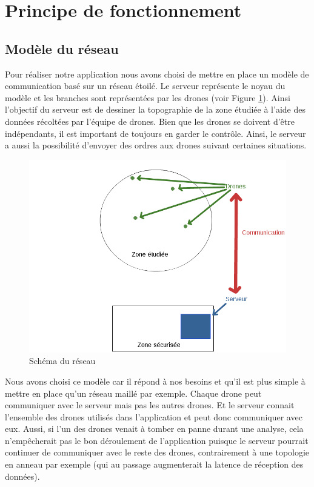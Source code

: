 \documentclass[a4paper,10pt]{report}
\begin{document}
    \section{Principe de fonctionnement}
      \subsection{Modèle du réseau}
	Pour réaliser notre application nous avons choisi de mettre en place un 
modèle de communication basé sur un réseau étoilé. Le serveur représente le 
noyau du modèle et les branches sont représentées par les drones (voir 
Figure \ref{network_schema}). Ainsi l'objectif du serveur est de dessiner la 
topographie de la zone étudiée à l'aide des données récoltées par l'équipe de 
drones. Bien que les drones se doivent d'être indépendants, il est important de 
toujours en garder le contrôle. Ainsi, le serveur a aussi la possibilité 
d'envoyer des ordres aux drones suivant certaines situations.

	\begin{figure}[htbp]
	  \centering
	  \includegraphics[scale=0.4]{img/projet_schema.png}
	  \caption{Schéma du réseau}
	  \label{network_schema}
	\end{figure}
	
	\newpage
	
	Nous avons choisi ce modèle car il répond à nos besoins et qu'il est 
plus simple à mettre en place qu'un réseau maillé par exemple. Chaque 
drone peut communiquer avec le serveur mais pas les autres drones. Et le 
serveur connait l'ensemble des drones utilisés dans l'application et peut 
donc communiquer avec eux. Aussi, si l'un des drones venait à tomber en panne 
durant une analyse, cela n'empêcherait pas le bon déroulement de l'application 
puisque le serveur pourrait continuer de communiquer avec le reste des drones, 
contrairement à une topologie en anneau par exemple (qui au passage 
augmenterait 
la latence de réception des données).
      
\end{document}
